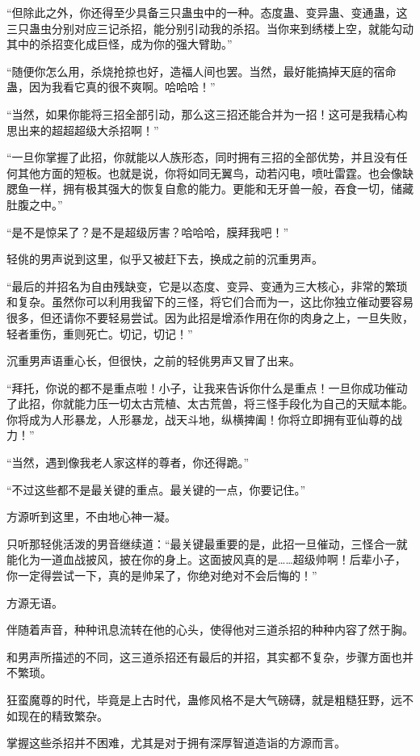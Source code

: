 \begin{this_body}
“但除此之外，你还得至少具备三只蛊虫中的一种。态度蛊、变异蛊、变通蛊，这三只蛊虫分别对应三记杀招，能分别引动我的杀招。当你来到绣楼上空，就能勾动其中的杀招变化成巨怪，成为你的强大臂助。”

“随便你怎么用，杀烧抢掠也好，造福人间也罢。当然，最好能搞掉天庭的宿命蛊，因为我看它真的很不爽啊。哈哈哈！”

“当然，如果你能将三招全部引动，那么这三招还能合并为一招！这可是我精心构思出来的超超超级大杀招啊！”

“一旦你掌握了此招，你就能以人族形态，同时拥有三招的全部优势，并且没有任何其他方面的短板。也就是说，你将如同无翼鸟，动若闪电，喷吐雷霆。也会像缺腮鱼一样，拥有极其强大的恢复自愈的能力。更能和无牙兽一般，吞食一切，储藏肚腹之中。”

“是不是惊呆了？是不是超级厉害？哈哈哈，膜拜我吧！”

轻佻的男声说到这里，似乎又被赶下去，换成之前的沉重男声。

“最后的并招名为自由残缺变，它是以态度、变异、变通为三大核心，非常的繁琐和复杂。虽然你可以利用我留下的三怪，将它们合而为一，这比你独立催动要容易很多，但还请你不要轻易尝试。因为此招是增添作用在你的肉身之上，一旦失败，轻者重伤，重则死亡。切记，切记！”

沉重男声语重心长，但很快，之前的轻佻男声又冒了出来。

“拜托，你说的都不是重点啦！小子，让我来告诉你什么是重点！一旦你成功催动了此招，你就能力压一切太古荒植、太古荒兽，将三怪手段化为自己的天赋本能。你将成为人形暴龙，人形暴龙，战天斗地，纵横捭阖！你将立即拥有亚仙尊的战力！”

“当然，遇到像我老人家这样的尊者，你还得跪。”

“不过这些都不是最关键的重点。最关键的一点，你要记住。”

方源听到这里，不由地心神一凝。

只听那轻佻活泼的男音继续道：“最关键最重要的是，此招一旦催动，三怪合一就能化为一道血战披风，披在你的身上。这面披风真的是……超级帅啊！后辈小子，你一定得尝试一下，真的是帅呆了，你绝对绝对不会后悔的！”

方源无语。

伴随着声音，种种讯息流转在他的心头，使得他对三道杀招的种种内容了然于胸。

和男声所描述的不同，这三道杀招还有最后的并招，其实都不复杂，步骤方面也并不繁琐。

狂蛮魔尊的时代，毕竟是上古时代，蛊修风格不是大气磅礴，就是粗糙狂野，远不如现在的精致繁杂。

掌握这些杀招并不困难，尤其是对于拥有深厚智道造诣的方源而言。


\end{this_body}
